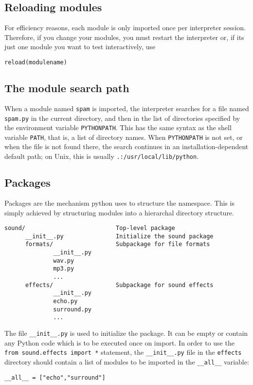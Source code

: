 \documentclass[10pt,a4paper]{article}
\begin{document}
\subsection{Reloading modules}
For efficiency reasons, each module is only imported once per interpreter session. Therefore, if you change your modules, you must restart the interpreter or, if its just one module you want to test interactively, use
\begin{lstlisting}
reload(modulename)
\end{lstlisting}
\subsection{The module search path}
When a module named \verb|spam| is imported, the interpreter searches for a file named \verb|spam.py| in the current directory, and then in the list of directories specified by the environment variable \verb|PYTHONPATH|. This has the same syntax as the shell variable \verb|PATH|, that is, a list of directory names. When \verb|PYTHONPATH| is not set, or when the file is not found there, the search continues in an installation-dependent default path; on Unix, this is usually \verb|.:/usr/local/lib/python|.
\subsection{Packages}
Packages are the mechanism python uses to structure the namespace.
This is simply achieved by structuring modules into a hierarchal directory structure.
\begin{Verbatim}
sound/                          Top-level package
      __init__.py               Initialize the sound package
      formats/                  Subpackage for file formats
              __init__.py
              wav.py
              mp3.py
              ...
      effects/                  Subpackage for sound effects
              __init__.py
              echo.py
              surround.py
              ...
\end{Verbatim}
The file \verb|__init__.py| is used to initialize the package.
It can be empty or contain any Python code which is to be executed once on import.
In order to use the \verb|from sound.effects import *| statement, the \verb|__init__.py| file in the \verb|effects| directory should contain a list of modules to be imported in the \verb|__all__| variable:
\begin{lstlisting}
__all__ = ["echo","surround"]
\end{lstlisting}
\end{document}

